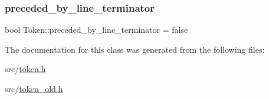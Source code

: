 \subsubsection{\texorpdfstring{preceded\+\_\+by\+\_\+line\+\_\+terminator}{preceded\_by\_line\_terminator}}
{\footnotesize\ttfamily bool Token\+::preceded\+\_\+by\+\_\+line\+\_\+terminator = false}



The documentation for this class was generated from the following files\+:\begin{DoxyCompactItemize}
\item 
src/\hyperlink{token_8h}{token.\+h}\item 
src/\hyperlink{token__old_8h}{token\+\_\+old.\+h}\end{DoxyCompactItemize}
